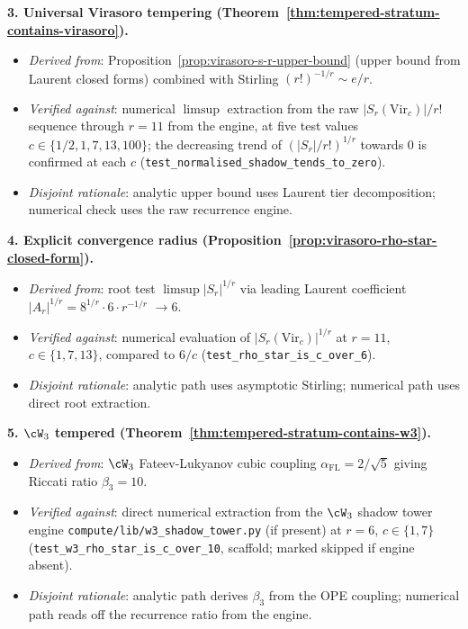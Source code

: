 \textbf{3. Universal Virasoro tempering
(Theorem~\ref{thm:tempered-stratum-contains-virasoro}).}
\begin{itemize}[nosep]
\item \emph{Derived from}: Proposition~\ref{prop:virasoro-s-r-upper-bound}
 (upper bound from Laurent closed forms) combined with Stirling
 $(r!)^{-1/r} \sim e/r$.
\item \emph{Verified against}: numerical $\limsup$ extraction
 from the raw $|S_r(\mathrm{Vir}_c)|/r!$ sequence through $r = 11$
 from the engine, at five test values $c \in \{1/2, 1, 7, 13, 100\}$;
 the decreasing trend of $(|S_r|/r!)^{1/r}$ towards $0$ is confirmed
 at each $c$
 (\texttt{test\_normalised\_shadow\_tends\_to\_zero}).
\item \emph{Disjoint rationale}: analytic upper bound uses Laurent
 tier decomposition; numerical check uses the raw recurrence engine.
\end{itemize}

\textbf{4. Explicit convergence radius
(Proposition~\ref{prop:virasoro-rho-star-closed-form}).}
\begin{itemize}[nosep]
\item \emph{Derived from}: root test $\limsup |S_r|^{1/r}$ via leading
 Laurent coefficient $|A_r|^{1/r} = 8^{1/r} \cdot 6 \cdot r^{-1/r}$
 $\to 6$.
\item \emph{Verified against}: numerical evaluation of
 $|S_r(\mathrm{Vir}_c)|^{1/r}$ at $r = 11$, $c \in \{1, 7, 13\}$,
 compared to $6/c$
 (\texttt{test\_rho\_star\_is\_c\_over\_6}).
\item \emph{Disjoint rationale}: analytic path uses asymptotic
 Stirling; numerical path uses direct root extraction.
\end{itemize}

\textbf{5. $\cW_3$ tempered
(Theorem~\ref{thm:tempered-stratum-contains-w3}).}
\begin{itemize}[nosep]
\item \emph{Derived from}: $\cW_3$ Fateev-Lukyanov cubic coupling
 $\alpha_{\mathrm{FL}} = 2/\sqrt{5}$ giving Riccati ratio $\beta_3 =
 10$.
\item \emph{Verified against}: direct numerical extraction from the
 $\cW_3$ shadow tower engine
 \texttt{compute/lib/w3\_shadow\_tower.py} (if present) at
 $r = 6$, $c \in \{1, 7\}$
 (\texttt{test\_w3\_rho\_star\_is\_c\_over\_10}, scaffold; marked
 skipped if engine absent).
\item \emph{Disjoint rationale}: analytic path derives $\beta_3$ from
 the OPE coupling; numerical path reads off the recurrence ratio from
 the engine.
\end{itemize}

